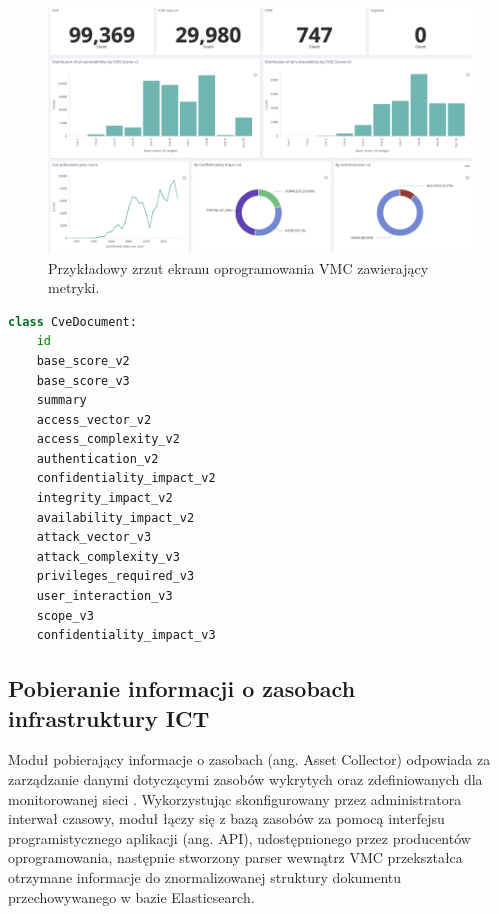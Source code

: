 \begin{figure}[thb]
\centering
\includegraphics[width=\columnwidth]{Chapters/Rozwiazanie/vmc/kibana-sample.png}
\caption{Przykładowy zrzut ekranu oprogramowania VMC zawierający metryki.}
\label{fig:chapter3:kibana-sample}
\end{figure}

\newpage
\begin{lstlisting}[caption={Przykładowy dokument prezentujący informacje zebrane o podatnościach (ang. CVE) w Elasticsearch.}, label={lst:chapter3:cvedocument}, language=Python, captionpos=b]
class CveDocument:
    id
    base_score_v2
    base_score_v3
    summary
    access_vector_v2
    access_complexity_v2
    authentication_v2
    confidentiality_impact_v2
    integrity_impact_v2
    availability_impact_v2
    attack_vector_v3
    attack_complexity_v3
    privileges_required_v3
    user_interaction_v3
    scope_v3
    confidentiality_impact_v3
\end{lstlisting}


\subsection{Pobieranie informacji o zasobach infrastruktury ICT}
\label{sec:cia_desc}
Moduł pobierający informacje o zasobach (ang. Asset Collector) odpowiada za zarządzanie danymi dotyczącymi zasobów wykrytych oraz zdefiniowanych dla monitorowanej sieci \cite{weintraub2016security}. Wykorzystując skonfigurowany przez administratora interwał czasowy, moduł łączy się z bazą zasobów za pomocą interfejsu programistycznego aplikacji (ang. API), udostępnionego przez producentów oprogramowania, następnie stworzony parser wewnątrz VMC przekształca otrzymane informacje do znormalizowanej struktury dokumentu przechowywanego w bazie Elasticsearch.


